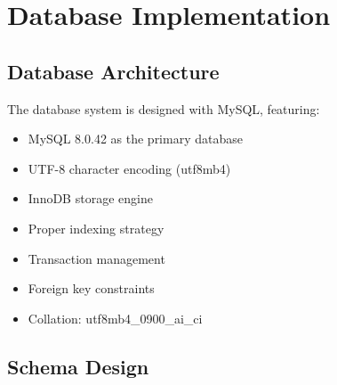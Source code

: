 \chapter{Database Implementation}

\section{Database Architecture}
The database system is designed with MySQL, featuring:
\begin{itemize}
    \item MySQL 8.0.42 as the primary database
    \item UTF-8 character encoding (utf8mb4)
    \item InnoDB storage engine
    \item Proper indexing strategy
    \item Transaction management
    \item Foreign key constraints
    \item Collation: utf8mb4\_0900\_ai\_ci
\end{itemize}

\section{Schema Design}
